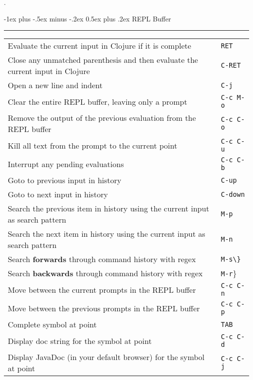 \documentclass[12pt,landscape]{article}
\makeatletter
\renewcommand{\section}{\@startsection{section}{1}{0mm}%
                                {-1ex plus -.5ex minus -.2ex}%
                                {0.5ex plus .2ex}%
                                {\normalfont\large\bfseries}}
\makeatother
\begin{document}
\begin{multicols}{3}
\begin{tabular}{p{6cm}p{1cm}}
\end{tabular}

\vfill
\columnbreak


\begin{center}
	
\end{center}.

\section{REPL Buffer}\smallskip \hrule height 2pt \smallskip
\begin{tabular}{p{6cm}p{1cm}} %

  Evaluate the current input in Clojure if it is complete & \verb!RET! \\
  Close any unmatched parenthesis and then evaluate the current input in Clojure & \verb!C-RET! \\
  Open a new line and indent & \verb!C-j! \\
  Clear the entire REPL buffer, leaving only a prompt & \verb!C-c M-o! \\
  Remove the output of the previous evaluation from the REPL buffer & \verb!C-c C-o! \\
  Kill all text from the prompt to the current point & \verb!C-c C-u! \\
  Interrupt any pending evaluations & \verb!C-c C-b! \\
  Goto to previous input in history & \verb!C-up! \\
  Goto to next input in history & \verb!C-down! \\
  Search the previous item in history using the current input as search pattern & \verb!M-p! \\
  Search the next item in history using the current input as search pattern & \verb!M-n! \\
  Search {\bf forwards } through command history with regex & \verb!M-s\}! \\
  Search {\bf backwards} through command history with regex & \verb!M-r!\} \\
  Move between the current prompts in the REPL buffer & \verb!C-c C-n! \\
  Move between the previous prompts in the REPL buffer & \verb!C-c C-p! \\
  Complete symbol at point & \verb!TAB! \\
  Display doc string for the symbol at point & \verb!C-c C-d! \\
  Display JavaDoc (in your default browser) for the symbol at point & \verb!C-c C-j! \\
\end{tabular}



\end{multicols}
\end{document}
